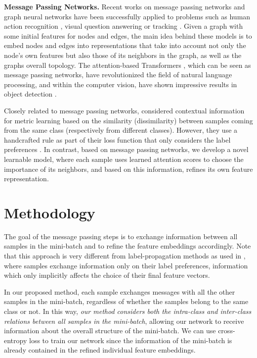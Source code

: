\documentclass{article}
\begin{document}
\textbf{Message Passing Networks.}
Recent works on message passing networks \cite{DBLP:conf/icml/GilmerSRVD17} and graph neural networks \cite{DBLP:journals/corr/abs-1806-01261,DBLP:conf/iclr/KipfW17} have been successfully applied to problems such as human action recognition \cite{DBLP:conf/eccv/GuoCHSYF18}, visual question answering \cite{DBLP:conf/nips/NarasimhanLS18} or tracking \cite{DBLP:conf/cvpr/BrasoL20}. 
Given a graph with some initial
features for nodes and edges, the main idea behind these models is to embed nodes and edges into representations that take into account not only the node’s own
features but also those of its neighbors in the graph, as well as the graphs overall topology. 
The attention-based Transformers \cite{DBLP:conf/nips/VaswaniSPUJGKP17,DBLP:conf/icml/XuBKCCSZB15}, which can be seen as message passing networks, have revolutionized the field of natural language processing, and within the computer vision, have shown impressive results in object detection \cite{DBLP:journals/corr/abs-2005-12872}. 


Closely related to message passing networks, \cite{DBLP:conf/eccv/GrLoss} considered contextual information for metric learning based on the similarity (dissimilarity) between samples coming from the same class (respectively from different classes). However, they use a handcrafted rule as part of their loss function that only considers the label preferences \cite{DBLP:conf/icpr/EleziTVP18}. In contrast, based on message passing networks, we develop a novel learnable model, where each sample uses learned attention scores to choose the importance of its neighbors, and based on this information, refines its own feature representation.
 \section{Methodology}
The goal of the message passing steps is to exchange information between all samples in the mini-batch and to refine the feature embeddings accordingly. 
Note that this approach is very different from label-propagation methods as used in \cite{DBLP:conf/eccv/GrLoss}, where samples exchange information only on their label preferences, information which only implicitly affects the choice of their final feature vectors.

In our proposed method, each sample exchanges messages with all the other samples in the mini-batch, regardless of whether the samples belong to the same class or not. In this way, \textit{our method considers both the intra-class and inter-class relations between all samples in the mini-batch}, allowing our network to receive information about the overall structure of the mini-batch.
We can use cross-entropy loss to train our network since the information of the mini-batch is already contained in the refined individual feature embeddings. 
\end{document}
